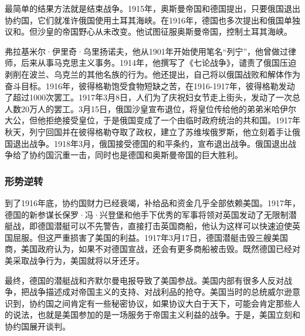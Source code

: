 \documentclass{article}
\begin{document}
最简单的结果方法就是结束战争。1915年，奥斯曼帝国和德国提出，只要俄国退出协约国，它们就准许俄国使用土耳其海峡。在1916年，德国也多次提出和俄国单独议和。但沙皇的帝国野心从未改变。他试图征服奥斯曼帝国，控制土耳其海峡。

弗拉基米尔·伊里奇·乌里扬诺夫，他从1901年开始使用笔名“列宁”，他曾做过律师，后来从事马克思主义事务。1914年，他撰写了《七论战争》，谴责了俄国压迫剥削在波兰、乌克兰的其他名族的行为。他还提出，自己将以俄国战败和解体作为奋斗目标。1916年，彼得格勒饱受食物短缺之苦，在1916-1917年，彼得格勒发动了超过1000次罢工。1917年3月8日，人们为了庆祝妇女节走上街头，发动了一次总人数20万人的罢工。3月15日，俄国沙皇宣布退位，将皇位传给他的弟弟米哈伊尔大公，但他拒绝接受皇位，于是俄国变成了一个由临时政府统治的共和国。1917年秋天，列宁回国并在彼得格勒夺取了政权，建立了苏维埃俄罗斯，他立刻着手让俄国退出战争。1918年3月，俄国接受德国的和平条约，宣布退出战争。俄国退出战争给了协约国沉重一击，同时也是德国和奥斯曼帝国的巨大胜利。
\subsubsection{形势逆转}
到了1916年底，协约国财力已经衰竭，补给品和资金几乎全部依赖美国。1917年，德国的新参谋长保罗·冯·兴登堡和他手下优秀的军事将领对英国发动了无限制潜艇战，即德国潜艇可以不先警告，直接打击英国商船，他认为这样可以快速迫使英国屈服。但这严重损害了美国的利益。1917年3月17日，德国潜艇击毁三艘美国商，美国政府认为，如果不对德国宣战，还会有更多商船被击毁。既然德国已经对美采取战争行为，美国就将以牙还牙。

最终，德国的潜艇战和齐默尔曼电报导致了美国参战。美国内部有很多人反对战争，把战争描述成对帝国主义的支持、对战利品的抢夺。美国当时的总统威尔逊意识到，协约国之间肯定有一些秘密协议，如果协议大白于天下，可能会肯定那些人的说法，也就是美国参加的是一场服务于帝国主义利益的战争。于是，美国立刻和协约国展开谈判。
\end{document}

